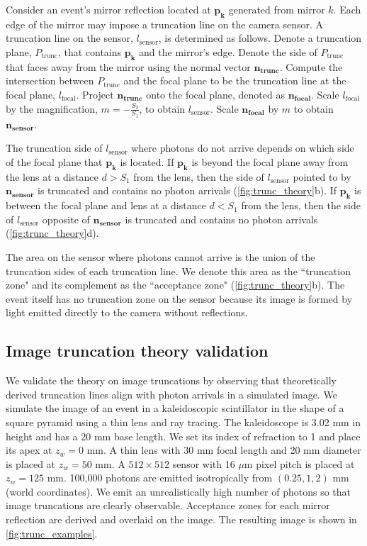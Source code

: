 Consider an event's mirror reflection located at $\bm{p_k}$ generated from mirror $k$.
Each edge of the mirror may impose a truncation line on the camera sensor.
A truncation line on the sensor, $l_\text{sensor}$, is determined as follows.
Denote a truncation plane, $P_{\text{trunc}}$, that contains $\bm{p_k}$ and the 
mirror's edge.
Denote the side of $P_{\text{trunc}}$ that faces away from the mirror using the 
normal vector $\bm{n_{\text{trunc}}}$.
Compute the intersection between $P_{\text{trunc}}$ and the focal plane to be the
truncation line at the focal plane, $l_\text{focal}$.
Project $\bm{n_{\text{trunc}}}$ onto the focal plane, denoted as 
$\bm{n_{\text{focal}}}$.
Scale $l_\text{focal}$ by the magnification, $m=-\frac{S_2}{S_1}$, to obtain $l_\text{sensor}$.
Scale $\bm{n_{\text{focal}}}$ by $m$ to obtain $\bm{n_{\text{sensor}}}$.

The truncation side of $l_\text{sensor}$ where photons do not arrive depends on 
which side of the focal plane that $\bm{p_k}$ is located.
If $\bm{p_k}$ is beyond the focal plane away from the lens at a distance $d>S_1$ 
from the lens, 
then the side of $l_\text{sensor}$ pointed to by $\bm{n_{\text{sensor}}}$ is 
truncated and contains no photon arrivals (\cref{fig:trunc_theory}b).
If $\bm{p_k}$ is between the focal plane and lens at a distance $d<S_1$ from the lens, 
then the side of $l_\text{sensor}$ opposite of $\bm{n_{\text{sensor}}}$ 
is truncated and contains no photon arrivals (\cref{fig:trunc_theory}d).

The area on the sensor where photons cannot arrive is the union of the
truncation sides of each truncation line.
We denote this area as the ``truncation zone" and its complement as the 
``acceptance zone" (\cref{fig:trunc_theory}b).
The event itself has no truncation zone on the sensor because its image is formed 
by light emitted directly to the camera without reflections.


\subsection{Image truncation theory validation}
We validate the theory on image truncations by observing that theoretically 
derived truncation lines align with photon arrivals in a simulated image.
We simulate the image of an event in a kaleidoscopic scintillator in the shape of 
a square pyramid using a thin lens and ray tracing. 
The kaleidoscope is 3.02 mm in height and has a 20 mm base length.
We set its index of refraction to 1 and place its apex at $z_w=0$ mm.
A thin lens with 30 mm focal length and 20 mm diameter is placed at $z_w=50$ mm.
A $512 \times 512$ sensor with 16 $\mu$m pixel pitch is placed at $z_w=125$ mm.
100,000 photons are emitted isotropically from $(0.25, 1, 2)$ mm (world 
coordinates).
We emit an unrealistically high number of photons so that image truncations are 
clearly observable.
Acceptance zones for each mirror reflection are derived and overlaid on the image.
The resulting image is shown in \cref{fig:trunc_examples}.

